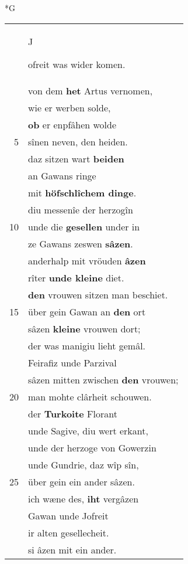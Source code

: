 \documentclass[8pt,a4paper,notitlepage]{article}
\begin{document}
\newpage
\begin{table}[ht]
\begin{minipage}[t]{0.5\linewidth}
\small
\begin{center}*G
\end{center}
\begin{tabular}{rl}
 & \begin{large}J\end{large}ofreit was wider komen.\\ 
 & von dem \textbf{het} Artus vernomen,\\ 
 & wie er werben solde,\\ 
 & \textbf{ob} er enpfâhen wolde\\ 
5 & sînen neven, den heiden.\\ 
 & daz sitzen wart \textbf{beiden}\\ 
 & an Gawans ringe\\ 
 & mit \textbf{höfschlîchem dinge}.\\ 
 & diu messenîe der herzogîn\\ 
10 & unde die \textbf{gesellen} under in\\ 
 & ze Gawans zeswen \textbf{sâzen}.\\ 
 & anderhalp mit vröuden \textbf{âzen}\\ 
 & rîter \textbf{unde kleine} diet.\\ 
 & \textbf{den} vrouwen sitzen man beschiet.\\ 
15 & über gein Gawan an \textbf{den} ort\\ 
 & sâzen \textbf{kleine} vrouwen dort;\\ 
 & der was manigiu lieht gemâl.\\ 
 & Feirafiz unde Parzival\\ 
 & sâzen mitten zwischen \textbf{den} vrouwen;\\ 
20 & man mohte clârheit schouwen.\\ 
 & der \textbf{Turkoite} Florant\\ 
 & unde Sagive, diu wert erkant,\\ 
 & unde der herzoge von Gowerzin\\ 
 & unde Gundrie, daz wîp sîn,\\ 
25 & über gein ein ander sâzen.\\ 
 & ich wæne des, \textbf{iht} vergâzen\\ 
 & Gawan unde Jofreit\\ 
 & ir alten gesellecheit.\\ 
 & si âzen mit ein ander.\\ 

\end{tabular}
\end{minipage}
\end{table}
\end{document}

